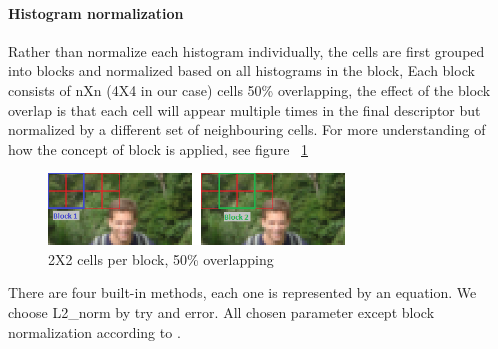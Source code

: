 \paragraph{} \paragraph{Histogram normalization} Rather than normalize each histogram individually, the cells are first grouped into blocks and normalized based on all histograms in the block, Each block consists of nXn (4X4 in our case) cells 50\% overlapping, the effect of the block overlap is that each cell will appear multiple times in the final descriptor but normalized by a different set of neighbouring cells.
\newline For more understanding of how the concept of block is applied, see figure ~\ref{fig:block normalization}
\begin{figure}
	\centering
	\includegraphics[width=0.70\textwidth]{blocks.png}
	\caption{2X2 cells per block, 50\% overlapping}
	\label{fig:block normalization}
\end{figure}
\newline 
There are four built-in methods, each one is represented by an equation.
\newline We choose L2\_norm by try and error.\newline
All chosen parameter except block normalization according to \cite{hog}.
